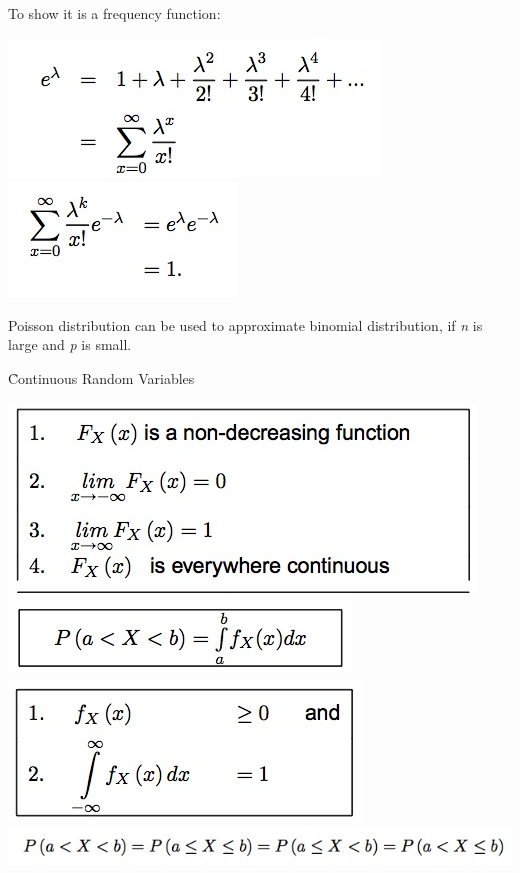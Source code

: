 \documentclass{examnotes}
\begin{document}
{
\vspace{6pt}

\disobeylines
{} %

\obeylines


To show it is a frequency function: 

\includegraphics[scale=0.7]{./img/2poi1.jpg}
\includegraphics[scale=0.7]{./img/2poi2.jpg}

Poisson distribution can be used to approximate binomial distribution, if \emph{n} is large and \emph{p} is small.

\h{Continuous Random Variables}

\includegraphics[scale=0.7]{./img/2con1.jpg}
\includegraphics[scale=0.7]{./img/2con2.jpg}
\includegraphics[scale=0.7]{./img/2con3.jpg}
\includegraphics[scale=0.7]{./img/2con4.jpg}

}
\end{document}
